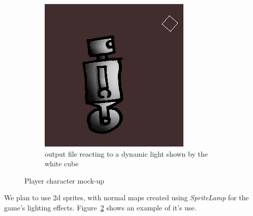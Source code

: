 \begin{figure}[ht]
\begin{subfigure}{.5\textwidth}
  \centering
  \includegraphics[scale=0.9, trim = 0cm 0cm 0cm 0.5cm]{images/out}	
  \caption{output file reacting to a dynamic light shown by the white cube}
  \label{fig:sub2:pl}
\end{subfigure}
\caption{Player character mock-up}
\label{fig:player}
\end{figure}

We plan to use 2d sprites, with normal maps created using \textit{SpriteLamp} for the game's lighting effects. Figure~\ref{fig:player} shows an example of it's use.
